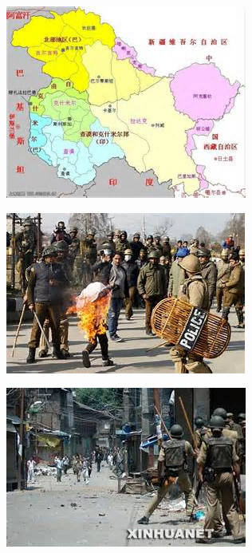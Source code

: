 \begin{figure}[th]
	\centering
    \begin{subfigure}{0.32\columnwidth}
        \centering
        \includegraphics[width=\columnwidth]{keshimier1.jpg}
    \end{subfigure}
    \begin{subfigure}{0.32\columnwidth}
        \centering
        \includegraphics[width=\columnwidth]{keshimier2.jpg}
    \end{subfigure}
	\begin{subfigure}{0.32\columnwidth}
        \centering
        \includegraphics[width=\columnwidth]{keshimier3.jpg}

\end{subfigure}
\end{figure}
